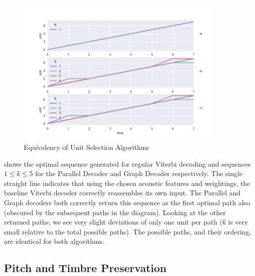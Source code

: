 {{{{{{{{\begin{figure}
	\begin{center}
		\includegraphics[width=0.9\textwidth]{ch05_pyconcat/figures/equivalence.png}
	\end{center}
	\caption[Equivalency of Unit Selection Algorithms]{Equivalency of Unit Selection Algorithms}
	\label{fig:equivalency}
\end{figure}

 shows the optimal sequence generated for regular Viterbi decoding and sequences $1 \leq k \leq 5$ for the Parallel Decoder and Graph Decoder respectively. The single straight line indicates that using the chosen acoustic features and weightings, the baseline Viterbi decoder correctly reassembles its own input. The Parallel and Graph decoders both correctly return this sequence as the first optimal path also (obscured by the subsequent paths in the diagram). Looking at the other returned paths, we see very slight deviations of only one unit per path ($k$ is very small relative to the total possible paths). The possible paths, and their ordering, are identical for both algorithms.

\subsection{Pitch and Timbre Preservation}

}}}}}}}}
